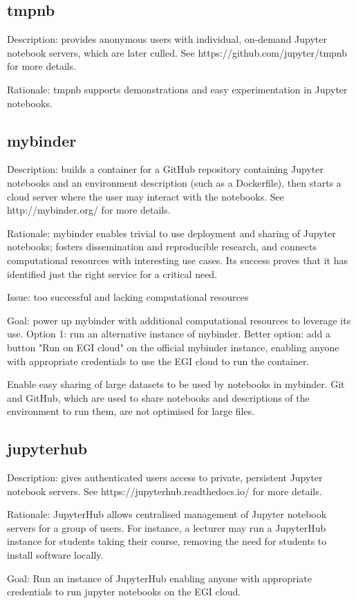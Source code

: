 \subsection{tmpnb}

Description: provides anonymous users with individual, on-demand Jupyter
notebook servers, which are later culled. See https://github.com/jupyter/tmpnb
for more details.

Rationale: tmpnb supports demonstrations and easy experimentation in
Jupyter notebooks.


\subsection{mybinder}

Description: builds a container for a GitHub repository containing
Jupyter notebooks and an environment description (such as a
Dockerfile), then starts a cloud server where the user may interact
with the notebooks. See http://mybinder.org/ for more details.

Rationale: mybinder enables trivial to use deployment and sharing of
Jupyter notebooks; fosters dissemination and reproducible research,
and connects computational resources with interesting use cases.
Its success proves that it has identified just the right service for
a critical need.

Issue: too successful and lacking computational resources

Goal: power up mybinder with additional computational resources to
leverage its use. Option 1: run an alternative instance of mybinder.
Better option: add a button "Run on EGI cloud" on the official
mybinder instance, enabling anyone with appropriate credentials to use
the EGI cloud to run the container.

Enable easy sharing of large datasets to be used by notebooks in mybinder. Git
and GitHub, which are used to share notebooks and descriptions of the
environment to run them, are not optimised for large files.

\subsection{jupyterhub}

Description: gives authenticated users access to private, persistent Jupyter
notebook servers. See https://jupyterhub.readthedocs.io/ for more details.

Rationale: JupyterHub allows centralised management of Jupyter notebook servers
for a group of users. For instance, a lecturer may run a JupyterHub instance for
students taking their course, removing the need for students to install software
locally.

Goal: Run an instance of JupyterHub enabling anyone with appropriate
credentials to run jupyter notebooks on the EGI cloud.
